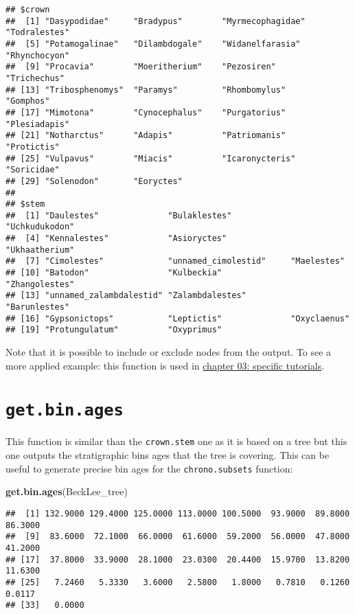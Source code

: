 \documentclass[
]{book}
\newenvironment{Shaded}{\begin{snugshade}}{\end{snugshade}}
\newcommand{\FunctionTok}[1]{\textcolor[rgb]{0.13,0.29,0.53}{\textbf{#1}}}
\newcommand{\NormalTok}[1]{#1}
\begin{document}
\begin{verbatim}
## $crown
##  [1] "Dasypodidae"     "Bradypus"        "Myrmecophagidae" "Todralestes"    
##  [5] "Potamogalinae"   "Dilambdogale"    "Widanelfarasia"  "Rhynchocyon"    
##  [9] "Procavia"        "Moeritherium"    "Pezosiren"       "Trichechus"     
## [13] "Tribosphenomys"  "Paramys"         "Rhombomylus"     "Gomphos"        
## [17] "Mimotona"        "Cynocephalus"    "Purgatorius"     "Plesiadapis"    
## [21] "Notharctus"      "Adapis"          "Patriomanis"     "Protictis"      
## [25] "Vulpavus"        "Miacis"          "Icaronycteris"   "Soricidae"      
## [29] "Solenodon"       "Eoryctes"       
## 
## $stem
##  [1] "Daulestes"              "Bulaklestes"            "Uchkudukodon"          
##  [4] "Kennalestes"            "Asioryctes"             "Ukhaatherium"          
##  [7] "Cimolestes"             "unnamed_cimolestid"     "Maelestes"             
## [10] "Batodon"                "Kulbeckia"              "Zhangolestes"          
## [13] "unnamed_zalambdalestid" "Zalambdalestes"         "Barunlestes"           
## [16] "Gypsonictops"           "Leptictis"              "Oxyclaenus"            
## [19] "Protungulatum"          "Oxyprimus"
\end{verbatim}

Note that it is possible to include or exclude nodes from the output.
To see a more applied example: this function is used in \protect\hyperlink{custom-subsets}{chapter 03: specific tutorials}.

\hypertarget{get.bin.ages}{%
\section{\texorpdfstring{\texttt{get.bin.ages}}{get.bin.ages}}\label{get.bin.ages}}

This function is similar than the \texttt{crown.stem} one as it is based on a tree but this one outputs the stratigraphic bins ages that the tree is covering.
This can be useful to generate precise bin ages for the \texttt{chrono.subsets} function:

\begin{Shaded}
\begin{Highlighting}[]
\FunctionTok{get.bin.ages}\NormalTok{(BeckLee\_tree)}
\end{Highlighting}
\end{Shaded}

\begin{verbatim}
##  [1] 132.9000 129.4000 125.0000 113.0000 100.5000  93.9000  89.8000  86.3000
##  [9]  83.6000  72.1000  66.0000  61.6000  59.2000  56.0000  47.8000  41.2000
## [17]  37.8000  33.9000  28.1000  23.0300  20.4400  15.9700  13.8200  11.6300
## [25]   7.2460   5.3330   3.6000   2.5800   1.8000   0.7810   0.1260   0.0117
## [33]   0.0000
\end{verbatim}
\end{document}
